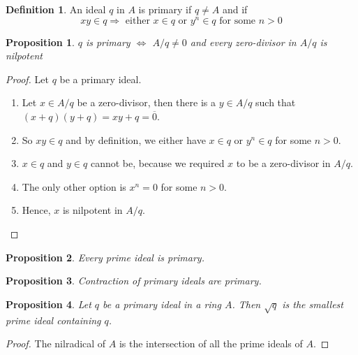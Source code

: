 \documentclass{book}
\theoremstyle{plain}
\newtheorem{prps}{Proposition}
\theoremstyle{definition}
\theoremstyle{custom_definition}
\newtheorem{defn}[thm]{Definition}
\begin{document}
\begin{defn}
    An ideal \(q\) in \(A\) is primary if \(q \neq A\) and if
    \begin{equation}
        xy \in q \Rightarrow \text{ either } x \in q \text{ or } y^n \in q \text{ for some } n > 0
    \end{equation}
\end{defn}

\begin{prps}
    \(q\) is primary \(\iff\) \(A/q \neq 0\) and every zero-divisor in \(A/q\) is nilpotent
\end{prps}

\begin{proof}
    Let \(q\) be a primary ideal.
    \begin{enumerate}
        \item Let \(x \in A/q\) be a zero-divisor, then there is a \(y \in A/q\) such that \((x + q)(y + q) = xy + q = \overline{0}\).
        \item So \(xy \in q\) and by definition, we either have \(x \in q\) or \(y^n \in q\) for some \(n > 0\).
        \item \(x \in q\) and \(y \in q\) cannot be, because we required \(x\) to be a zero-divisor in \(A/q\).
        \item The only other option is \(x^n = 0\) for some \(n > 0\).
        \item Hence, \(x\) is nilpotent in \(A/q\).
    \end{enumerate}
\end{proof}

\begin{prps}
    Every prime ideal is primary.
\end{prps}

\begin{prps}
    Contraction of primary ideals are primary.
\end{prps}

\begin{prps}
    Let \(q\) be a primary ideal in a ring \(A\). Then \(\sqrt{q}\) is the smallest prime ideal containing \(q\).
\end{prps}

\begin{proof}
    The nilradical of \(A\) is the intersection of all the prime ideals of \(A\).
\end{proof}
\end{document}
